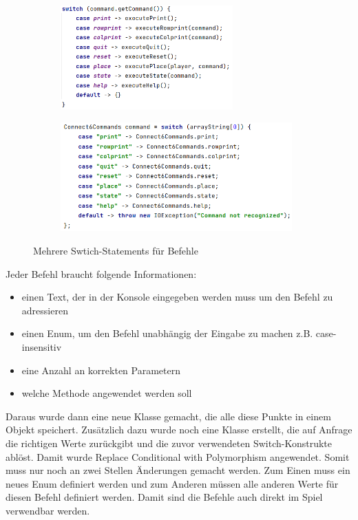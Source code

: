 \documentclass[12pt]{article}
\begin{document}
\begin{figure}[htpb!]
\centering
\begin{subfigure}{.4\textwidth}
  \centering
  {\includegraphics[height=4cm]{Bilder/Switch}}
  \label{fig:sub1}
\end{subfigure}%
\begin{subfigure}{.6\textwidth}
  \centering
  {\includegraphics[height=4.2cm]{Bilder/Switch2}}
  \label{fig:sub2}
\end{subfigure}
\caption{Mehrere Swtich-Statements für Befehle}
\label{fig:test}
\end{figure}

\noindent Jeder Befehl braucht folgende Informationen: 
\begin{itemize}
\item einen Text, der in der Konsole eingegeben werden muss um den Befehl zu adressieren
\item einen Enum, um den Befehl unabhängig der Eingabe zu machen z.B. case-insensitiv
\item eine Anzahl an korrekten Parametern
\item welche Methode angewendet werden soll
\end{itemize}

\noindent Daraus wurde dann eine neue Klasse gemacht, die alle diese Punkte in einem Objekt speichert. Zusätzlich dazu wurde noch eine Klasse erstellt, die auf Anfrage die richtigen Werte zurückgibt und die zuvor verwendeten Switch-Konstrukte ablöst. Damit wurde Replace Conditional with Polymorphism angewendet. Somit muss nur noch an zwei Stellen Änderungen gemacht werden. Zum Einen muss ein neues Enum definiert werden und zum Anderen müssen alle anderen Werte für diesen Befehl definiert werden. Damit sind die Befehle auch direkt im Spiel verwendbar werden.
\end{document}
